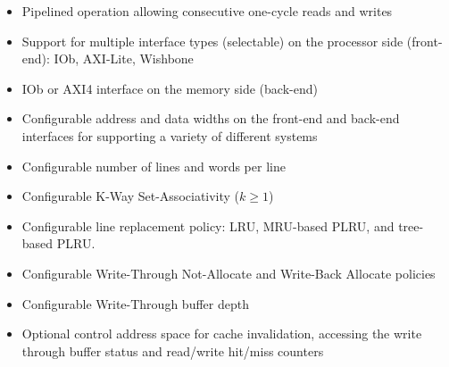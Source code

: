 %

\begin{itemize}
  \itemsep-0.5em
\item Pipelined operation allowing consecutive one-cycle reads and writes
\item Support for multiple interface types (selectable) on the processor side (front-end): IOb, AXI-Lite, Wishbone
\item IOb or AXI4 interface on the memory side (back-end)
\item Configurable address and data widths on the front-end and back-end interfaces for supporting a variety of different systems
\item Configurable number of lines and words per line
\item Configurable K-Way Set-Associativity ($k \geq 1$)
\item Configurable line replacement policy: LRU, MRU-based PLRU, and tree-based PLRU.
\item Configurable Write-Through Not-Allocate and Write-Back Allocate policies
\item Configurable Write-Through buffer depth
\item Optional control address space for cache invalidation, accessing the write through buffer status and read/write hit/miss counters
\end{itemize}
